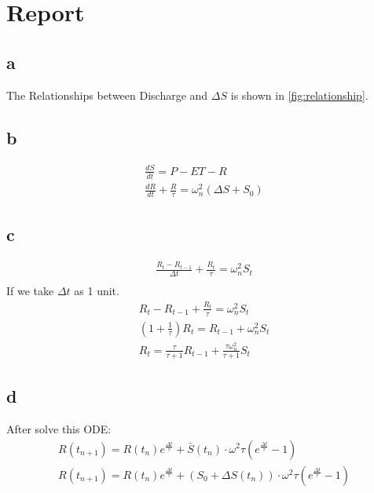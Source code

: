 \chapter{Report}
\section{a}
The Relationships between Discharge and $\Delta S$ is shown in \autoref{fig:relationship}.
\begin{figure}[htpb]\centering
	\caption{}
	\label{fig:relationship}
\end{figure}
\section{b}
\begin{gather*}
	\frac{dS}{dt} = P-ET-R \\
	\frac{dR}{dt} + \frac{R}{\tau} = \omega^2_n (\Delta S + S_{0})
\end{gather*}
\section{c}
\begin{gather*}
	\frac{R_t - R_{t-1}}{\Delta t} + \frac{R_t}{\tau} = \omega^2_n S_t \\
\end{gather*}
If we take $\Delta t$ as 1 unit.
\begin{gather*}
	R_t - R_{t-1} + \frac{R_t}{\tau} = \omega^2_n S_t \\
	\left(1+\frac{1}{\tau}\right) R_{t} = R_{t-1} +  \omega^2_n S_t \\
	R_{t} = \frac{\tau}{\tau + 1} R_{t-1} + \frac{\tau \omega_n^2}{\tau + 1}S_t
\end{gather*}
\section{d}
After solve this ODE:
\begin{gather*}
	R(t_{n+1}) = R(t_{n}) e^{\frac{\Delta t}{\tau}} + \bar{S}(t_{n}) \cdot \omega^2 \tau (e^{\frac{\Delta t}{\tau}} - 1) \\
	R(t_{n+1}) = R(t_{n}) e^{\frac{\Delta t}{\tau}} + \left(S_0 + \Delta S(t_{n})\right) \cdot \omega^2 \tau (e^{\frac{\Delta t}{\tau}} - 1)
\end{gather*}

